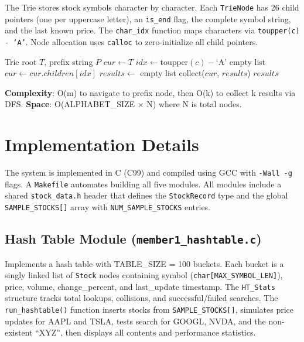 \documentclass[conference]{IEEEtran}
\begin{document}
The Trie stores stock symbols character by character. Each \texttt{TrieNode} has 26 child pointers (one per uppercase letter), an \texttt{is\_end} flag, the complete symbol string, and the last known price. The \texttt{char\_idx} function maps characters via \texttt{toupper(c) - `A'}. Node allocation uses \texttt{calloc} to zero-initialize all child pointers.

\begin{algorithm}
\caption{Trie Auto-Complete (\texttt{get\_suggestions})}
\begin{algorithmic}[1]
\REQUIRE Trie root $T$, prefix string $P$
\STATE $cur \gets T$
  \STATE $idx \gets \text{toupper}(c) - \text{`A'}$
    \RETURN empty list
  \ENDIF
  \STATE $cur \gets cur.children[idx]$
\ENDFOR
\STATE $results \gets$ empty list
\STATE collect($cur$, $results$) 
\RETURN $results$
\end{algorithmic}
\end{algorithm}

\textbf{Complexity}: O(m) to navigate to prefix node, then O(k) to collect k results via DFS. \textbf{Space}: O(ALPHABET\_SIZE $\times$ N) where N is total nodes.

\section{Implementation Details}

The system is implemented in C (C99) and compiled using GCC with \texttt{-Wall -g} flags. A \texttt{Makefile} automates building all five modules. All modules include a shared \texttt{stock\_data.h} header that defines the \texttt{StockRecord} type and the global \texttt{SAMPLE\_STOCKS[]} array with \texttt{NUM\_SAMPLE\_STOCKS} entries.

\subsection{Hash Table Module (\texttt{member1\_hashtable.c})}

Implements a hash table with TABLE\_SIZE = 100 buckets. Each bucket is a singly linked list of \texttt{Stock} nodes containing symbol (\texttt{char[MAX\_SYMBOL\_LEN]}), price, volume, change\_percent, and last\_update timestamp. The \texttt{HT\_Stats} structure tracks total lookups, collisions, and successful/failed searches. The \texttt{run\_hashtable()} function inserts stocks from \texttt{SAMPLE\_STOCKS[]}, simulates price updates for AAPL and TSLA, tests search for GOOGL, NVDA, and the non-existent ``XYZ'', then displays all contents and performance statistics.
\end{document}
